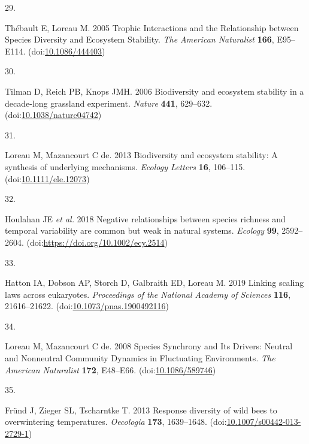 \documentclass[
]{article}
\newlength{\cslhangindent}
\newlength{\csllabelwidth}
\newlength{\cslentryspacingunit} %
\newenvironment{CSLReferences}[2] %
 {%
  \setlength{\parindent}{0pt}
  \ifodd #1
  \let\oldpar\par
  \def\par{\hangindent=\cslhangindent\oldpar}
  \fi
  \setlength{\parskip}{#2\cslentryspacingunit}
 }%
 {}
\newcommand{\CSLLeftMargin}[1]{\parbox[t]{\csllabelwidth}{#1}}
\newcommand{\CSLRightInline}[1]{\parbox[t]{\linewidth - \csllabelwidth}{#1}\break}
\begin{document}
\begin{CSLReferences}{0}{0}
\leavevmode{}%
\CSLLeftMargin{29. }%
\CSLRightInline{Thébault E, Loreau M. 2005 Trophic {Interactions} and the {Relationship} between {Species} {Diversity} and {Ecosystem} {Stability}. \emph{The American Naturalist} \textbf{166}, E95--E114. (doi:\href{https://doi.org/10.1086/444403}{10.1086/444403})}

\leavevmode{}%
\CSLLeftMargin{30. }%
\CSLRightInline{Tilman D, Reich PB, Knops JMH. 2006 Biodiversity and ecosystem stability in a decade-long grassland experiment. \emph{Nature} \textbf{441}, 629--632. (doi:\href{https://doi.org/10.1038/nature04742}{10.1038/nature04742})}

\leavevmode{}%
\CSLLeftMargin{31. }%
\CSLRightInline{Loreau M, Mazancourt C de. 2013 Biodiversity and ecosystem stability: A synthesis of underlying mechanisms. \emph{Ecology Letters} \textbf{16}, 106--115. (doi:\href{https://doi.org/10.1111/ele.12073}{10.1111/ele.12073})}

\leavevmode{}%
\CSLLeftMargin{32. }%
\CSLRightInline{Houlahan JE \emph{et al.} 2018 Negative relationships between species richness and temporal variability are common but weak in natural systems. \emph{Ecology} \textbf{99}, 2592--2604. (doi:\url{https://doi.org/10.1002/ecy.2514})}

\leavevmode{}%
\CSLLeftMargin{33. }%
\CSLRightInline{Hatton IA, Dobson AP, Storch D, Galbraith ED, Loreau M. 2019 Linking scaling laws across eukaryotes. \emph{Proceedings of the National Academy of Sciences} \textbf{116}, 21616--21622. (doi:\href{https://doi.org/10.1073/pnas.1900492116}{10.1073/pnas.1900492116})}

\leavevmode{}%
\CSLLeftMargin{34. }%
\CSLRightInline{Loreau M, Mazancourt C de. 2008 Species {Synchrony} and {Its} {Drivers}: {Neutral} and {Nonneutral} {Community} {Dynamics} in {Fluctuating} {Environments}. \emph{The American Naturalist} \textbf{172}, E48--E66. (doi:\href{https://doi.org/10.1086/589746}{10.1086/589746})}

\leavevmode{}%
\CSLLeftMargin{35. }%
\CSLRightInline{Fründ J, Zieger SL, Tscharntke T. 2013 Response diversity of wild bees to overwintering temperatures. \emph{Oecologia} \textbf{173}, 1639--1648. (doi:\href{https://doi.org/10.1007/s00442-013-2729-1}{10.1007/s00442-013-2729-1})}


\end{CSLReferences}
\end{document}
